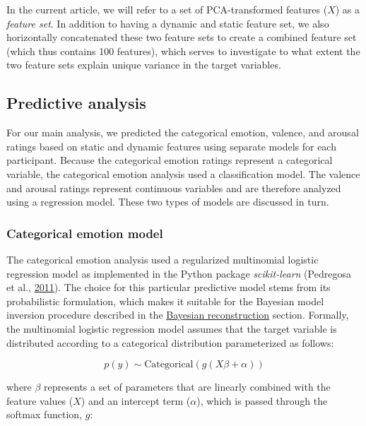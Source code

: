 \documentclass[11pt,american,a4paper,oneside,]{memoir} %
\begin{document}
In the current article, we will refer to a set of PCA-transformed features (\(X\)) as a \emph{feature set}. In addition to having a dynamic and static feature set, we also horizontally concatenated these two feature sets to create a combined feature set (which thus contains 100 features), which serves to investigate to what extent the two feature sets explain unique variance in the target variables.

\hypertarget{svsd-pred-analysis}{%
\subsection{Predictive analysis}\label{svsd-pred-analysis}}

For our main analysis, we predicted the categorical emotion, valence, and arousal ratings based on static and dynamic features using separate models for each participant. Because the categorical emotion ratings represent a categorical variable, the categorical emotion analysis used a classification model. The valence and arousal ratings represent continuous variables and are therefore analyzed using a regression model. These two types of models are discussed in turn.

\hypertarget{svsd-cat-emo}{%
\subsubsection{Categorical emotion model}\label{svsd-cat-emo}}

The categorical emotion analysis used a regularized multinomial logistic regression model as implemented in the Python package \emph{scikit-learn} (Pedregosa et al., \protect\hyperlink{ref-pedregosa2011scikit}{2011}). The choice for this particular predictive model stems from its probabilistic formulation, which makes it suitable for the Bayesian model inversion procedure described in the \protect\hyperlink{svsd-bayes}{Bayesian reconstruction} section. Formally, the multinomial logistic regression model assumes that the target variable is distributed according to a categorical distribution parameterized as follows:

\begin{equation}
p(y) \sim \mathrm{Categorical}(g(X\beta + \alpha))
\end{equation}

where \(\beta\) represents a set of parameters that are linearly combined with the feature values (\(X\)) and an intercept term (\(\alpha\)), which is passed through the softmax function, \(g\):
\end{document}
